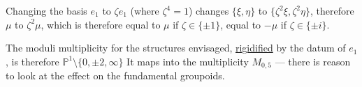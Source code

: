 
Changing the basis  \(e_1\) to \(\zeta e_1\) (where \(\zeta^4=1\))
 changes 
\(\{\xi,\eta\}\) to \(\{\zeta^2\xi,\zeta^2\eta\}\),
therefore \(\mu\) to \(\zeta^2\mu\), which is therefore
equal to \(\mu\) if \(\zeta\in\{\pm1\}\), equal to \(-\mu\) if
\(\zeta\in\{\pm i\}\).

The moduli multiplicity for the
structures envisaged, \uline{rigidified} by the
datum of \(e_1\), is therefore \(\mathbb P^1\setminus\{0,\pm2,\infty\}\)
It maps into the multiplicity
\(M_{0,5}\) --- there is reason to look at the effect
on the fundamental groupoids.

